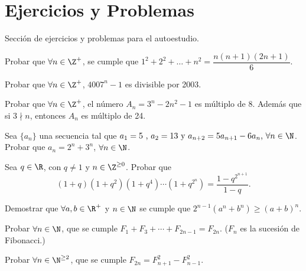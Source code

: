 \section{Ejercicios y Problemas}

    Sección de ejercicios y problemas para el autoestudio.

    \begin{problem}
        Probar que $\forall n \in \Z^+$, se cumple que $1^2 + 2^2 + \dots + n^2 = \dfrac{n(n+1)(2n+1)}{6}$.
    \end{problem}

    \begin{problem}
        Probar que $\forall n\in \Z^+$, $4007^n - 1$ es divisible por 2003.
    \end{problem}

    \begin{problem}
        Probar que $\forall n \in \Z^+$, el número $A_n = 3^n - 2n^2 - 1$ es múltiplo de $8$.
        Además que si $3\nmid n$, entonces $A_n$ es múltiplo de 24.
    \end{problem}

    \begin{problem}
        Sea $\{a_n\}$ una secuencia tal que $a_1 = 5 \mbox{ , } a_2 = 13 \mbox{ y } a_{n+2}=5a_{n+1}-6a_n \mbox{, } \forall n \in \N$.
        Probar que $a_n = 2^n+3^n$, $\forall n \in \N$.
    \end{problem}

    \begin{problem}
        Sea $q \in \R$, con $q \neq 1$ y $n \in \Z^{\geq 0}$.
        Probar que
        \[(1 + q)(1 + q^2)(1 + q^4)\cdots(1 + q^{2^n}) = \frac{1 - q^{2^{n + 1}} }{1 - q}.\]
    \end{problem}

    \begin{problem}
        Demostrar que $\forall a, b\in \R^+$ y $n \in \N$ se cumple que $2^{n - 1}(a^n + b^n) \geq (a + b)^n.$
    \end{problem}

    \begin{problem}
        Probar $\forall n \in \N$, que se cumple $F_1 + F_3 + \cdots + F_{2n - 1} = F_{2n}.$ ($F_n$ es la sucesión de Fibonacci.)
    \end{problem}

    \begin{problem}
        Probar $\forall n \in \N^{\geq 2}$, que se cumple $F_{2n} = F_{n + 1}^2 - F_{n - 1}^2.$
    \end{problem}
